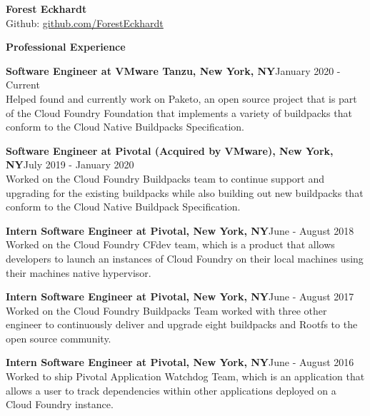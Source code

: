 \documentclass[10pt,a4papaer]{article}
\begin{document}
	{\selectfont
		
		\begin{center}	
			{\huge\textbf{Forest Eckhardt}} \\
			Github:
			\href{http://www.github.com/ForestEckhardt}{github.com/ForestEckhardt} \\
		\end{center}
		
		{\noindent\textbf{Professional Experience}}\vspace*{-20px}\\
		
		\noindent\makebox[\linewidth]{\rule{\textwidth}{1.2pt}}
		
		\setlength{\leftskip}{15pt}
		
		{\noindent\textbf{Software Engineer at VMware Tanzu, New York, NY}}{\hfill January 2020 - Current}\\
		{\noindent Helped found and currently work on Paketo, an open source project that is part of the Cloud Foundry Foundation that implements a variety of buildpacks that conform to the Cloud Native Buildpacks Specification.\\}
		
		{\noindent\textbf{Software Engineer at Pivotal (Acquired by VMware), New York, NY}}{\hfill July 2019 - January 2020}\\
		{\noindent Worked on the Cloud Foundry Buildpacks team to continue support and upgrading for the existing buildpacks while also building out new buildpacks that conform to the Cloud Native Buildpack Specification.\\}
		
		{\noindent\textbf{Intern Software Engineer at Pivotal, New York, NY}}{\hfill June - August 2018}\\
		{\noindent Worked on the Cloud Foundry CFdev team, which is a product that allows developers to launch an instances of Cloud Foundry on their local machines using their machines native hypervisor.\\}
		
		{\noindent\textbf{Intern Software Engineer at Pivotal, New York, NY}}{\hfill June - August 2017}\\
		{\noindent Worked on the Cloud Foundry Buildpacks Team worked with three other engineer to continuously deliver and upgrade eight buildpacks and Rootfs to the open source community.\\}
		
		{\noindent\textbf{Intern Software Engineer at Pivotal, New York, NY}}{\hfill June - August 2016}\\
		{\noindent Worked to ship Pivotal Application Watchdog Team, which is an application that allows a user to track dependencies within other applications deployed on a Cloud Foundry instance.\\}
		
}
\end{document}
